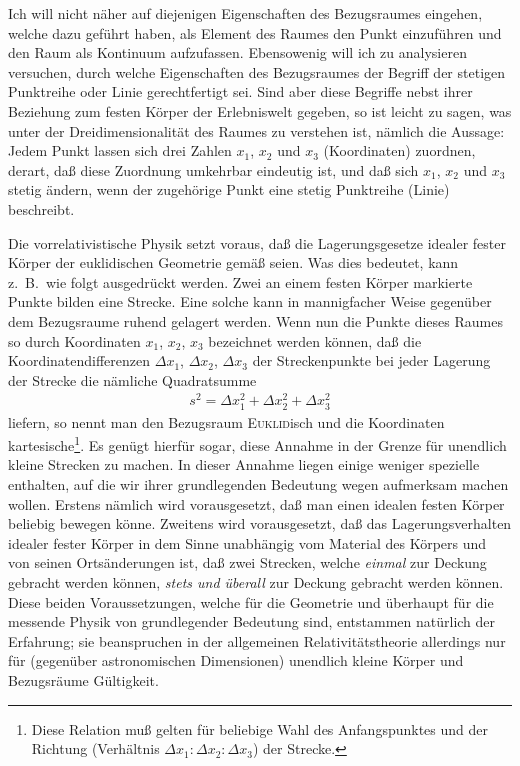 Ich will nicht näher auf diejenigen Eigenschaften des Bezugsraumes eingehen, 
welche dazu geführt haben, als Element des Raumes den Punkt einzuführen und den 
Raum als Kontinuum aufzufassen. Ebensowenig will ich zu analysieren versuchen, 
durch welche Eigenschaften des Bezugsraumes der Begriff der stetigen Punktreihe 
oder Linie gerechtfertigt sei. Sind aber diese Begriffe nebst ihrer Beziehung 
zum festen Körper der Erlebniswelt gegeben, so ist leicht zu sagen, was unter 
der Dreidimensionalität des Raumes zu verstehen ist, nämlich die Aussage: Jedem 
Punkt lassen sich drei Zahlen $x_1$, $x_2$ und $x_3$ (Koordinaten) zuordnen, 
derart, daß diese Zuordnung umkehrbar eindeutig ist, und daß sich $x_1$, $x_2$ 
und $x_3$ stetig ändern, wenn der zugehörige Punkt eine stetig Punktreihe 
(Linie) beschreibt.

Die vorrelativistische Physik setzt voraus, daß die Lagerungsgesetze idealer 
fester Körper der euklidischen Geometrie gemäß seien. Was dies bedeutet, kann 
z.\ B.\ wie folgt ausgedrückt werden. Zwei an einem festen Körper markierte 
Punkte bilden eine Strecke. Eine solche kann in mannigfacher Weise gegenüber dem 
Bezugsraume ruhend gelagert werden. Wenn nun die Punkte dieses Raumes so durch 
Koordinaten $x_1$, $x_2$, $x_3$ bezeichnet werden können, daß die 
Koordinatendifferenzen $\Delta x_1$, $\Delta x_2$, $\Delta x_3$ der 
Streckenpunkte bei jeder Lagerung der Strecke die nämliche Quadratsumme
\begin{align}
    s^2 = \Delta x_1^2 + \Delta x_2^2 + \Delta x_3^2
\end{align}
liefern, so nennt man den Bezugsraum \textsc{Euklid}isch und die Koordinaten 
kartesische\footnote{Diese Relation muß gelten für beliebige Wahl des 
Anfangspunktes und der Richtung (Verhältnis $\Delta x_1 : \Delta x_2 : \Delta 
x_3$) der Strecke.}. Es genügt hierfür sogar, diese Annahme in der Grenze für 
unendlich kleine Strecken zu machen. In dieser Annahme liegen einige weniger 
spezielle enthalten, auf die wir ihrer grundlegenden Bedeutung wegen aufmerksam 
machen wollen. Erstens nämlich wird vorausgesetzt, daß man einen idealen festen 
Körper beliebig bewegen könne. Zweitens wird vorausgesetzt, daß das 
Lagerungsverhalten idealer fester Körper in dem Sinne unabhängig vom Material 
des Körpers und von seinen Ortsänderungen ist, daß zwei Strecken, welche 
\emph{einmal} zur Deckung gebracht werden können, \emph{stets und überall} zur 
Deckung gebracht werden können. Diese beiden Voraussetzungen, welche für die 
Geometrie und überhaupt für die messende Physik von grundlegender Bedeutung 
sind, entstammen natürlich der Erfahrung; sie beanspruchen in der allgemeinen 
Relativitätstheorie allerdings nur für (gegenüber astronomischen Dimensionen) 
unendlich kleine Körper und Bezugsräume Gültigkeit.

